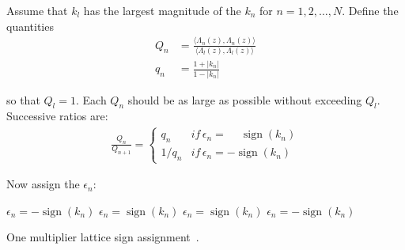 \documentclass[a4paper,twoside,10pt,english]{article}
\DeclareMathOperator{\sign}{sign}
\begin{document}
\begin{algorithm}[!ht]
Assume that $k_{l}$ has the largest magnitude of the $k_{n}$ for
$n=1,2,\ldots,N$. Define the quantities
\begin{align*}
  Q_{n}&=\frac{\langle\Lambda_{n}\left(z\right),\Lambda_{n}\left(z\right)\rangle}
             {\langle\Lambda_{l}\left(z\right),\Lambda_{l}\left(z\right)\rangle}\\
  q_{n}&=\frac{1+\left|k_{n}\right|}{1-\left|k_{n}\right|}
\end{align*}

so that $Q_{l}=1$. Each $Q_{n}$ should be as large as possible without
exceeding $Q_{l}$. Successive ratios are:
\begin{align}
\frac{Q_{n}}{Q_{n+1}} = \begin{cases}
q_{n} & if\,\epsilon_{n}=\phantom{-}\sign\left(k_{n}\right)\\
1/q_{n} & if\,\epsilon_{n}=-\sign\left(k_{n}\right)
\end{cases}\label{eq:OneMultRecursiveKCalc}
\end{align}

Now assign the $\epsilon_{n}$:
\begin{algorithmic}
    \State $\epsilon_{n}=-\sign\left(k_{n}\right)$
  \Else
    \State $\epsilon_{n}=\sign\left(k_{n}\right)$
  \EndIf
\EndFor
{}
    \State $\epsilon_{n}=\sign\left(k_{n}\right)$
  \Else
    \State $\epsilon_{n}=-\sign\left(k_{n}\right)$
  \EndIf
\EndFor
\end{algorithmic}
\caption{One multiplier lattice sign
  assignment~\cite[p. 496]{GrayMarkel_DigitalLatticeAndLadderFilterSynthesis}.} 
\label{alg:One-multiplier-sign-assignment}
\end{algorithm}

\clearpage
\end{document}
